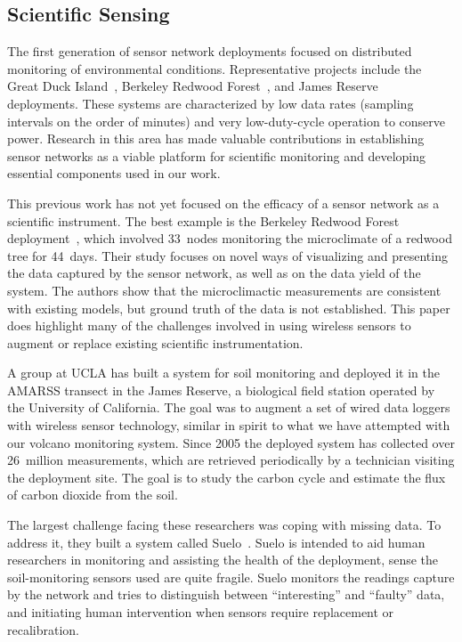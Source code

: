 
\subsection{Scientific Sensing}

The first generation of sensor network deployments focused on distributed
monitoring of environmental conditions. Representative projects include the
Great Duck Island~\cite{spm:04habitat,polastre-masters,mainwaring-habitat},
Berkeley Redwood Forest~\cite{berkeley-redwoods}, and James
Reserve~\cite{cerpa-habitat} deployments. These systems are characterized by
low data rates (sampling intervals on the order of minutes) and very
low-duty-cycle operation to conserve power. Research in this area has made
valuable contributions in establishing sensor networks as a viable platform
for scientific monitoring and developing essential components used in our
work. 

This previous work has not yet focused on the efficacy of a sensor network as
a scientific instrument. The best example is the Berkeley Redwood Forest
deployment~\cite{berkeley-redwoods}, which involved 33~nodes monitoring the
microclimate of a redwood tree for 44~days. Their study focuses on novel ways
of visualizing and presenting the data captured by the sensor network, as
well as on the data yield of the system. The authors show that the
microclimactic measurements are consistent with existing models, but ground
truth of the data is not established. This paper does highlight many of the
challenges involved in using wireless sensors to augment or replace existing
scientific instrumentation.

A group at UCLA has built a system for soil monitoring and deployed it in the
AMARSS transect in the James Reserve, a biological field station operated by
the University of California. The goal was to augment a set of wired data
loggers with wireless sensor technology, similar in spirit to what we have
attempted with our volcano monitoring system. Since 2005 the deployed system
has collected over 26~million measurements, which are retrieved periodically
by a technician visiting the deployment site. The goal is to study the carbon
cycle and estimate the flux of carbon dioxide from the soil.

The largest challenge facing these researchers was coping with missing data.
To address it, they built a system called Suelo~\cite{suelo-sensys09}.  Suelo
is intended to aid human researchers in monitoring and assisting the health
of the deployment, sense the soil-monitoring sensors used are quite fragile.
Suelo monitors the readings capture by the network and tries to distinguish
between ``interesting'' and ``faulty'' data, and initiating human
intervention when sensors require replacement or recalibration.

